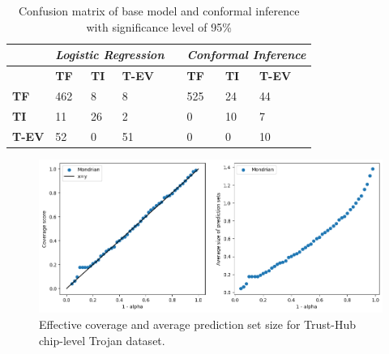 \begin{table}[]
\caption{Confusion matrix of base model and conformal inference with significance level of 95\%}
\centering
\begin{tabular}{llllllll}
\hline
              & \multicolumn{3}{l}{\textit{\textbf{Logistic Regression}}} &  & \multicolumn{3}{l}{\textit{\textbf{Conformal Inference}}} \\ \hline
              & \textbf{TF}       & \textbf{TI}      & \textbf{T-EV}      &  & \textbf{TF}       & \textbf{TI}      & \textbf{T-EV}      \\ \hline
\textbf{TF}   & 462               & 8                & 8                  &  & 525               & 24               & 44                 \\ \hline
\textbf{TI}   & 11                & 26               & 2                  &  & 0                 & 10               & 7                  \\ \hline
\textbf{T-EV} & 52                & 0                & 51                 &  & 0                 & 0                & 10                 \\ \hline
\end{tabular}
\label{tab:basecm}
\end{table}

\begin{figure}[ht]
  \includegraphics[width=1\linewidth]{figs/cp/cp_score_coverage_and_prediction_Set.png}
  \caption{Effective coverage and average prediction set size for Trust-Hub chip-level Trojan dataset.}
  \label{fig:split}
\end{figure}

